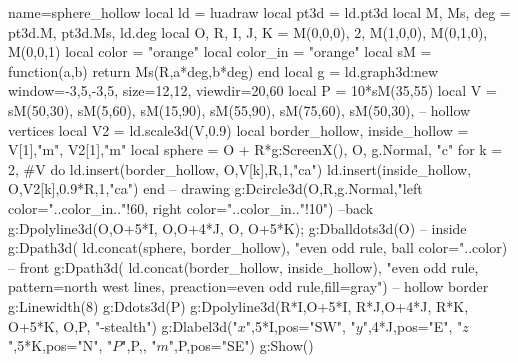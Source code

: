 \documentclass[border=5pt]{standalone}%
\begin{document}
\begin{luadraw}{name=sphere_hollow}
local ld = luadraw
local pt3d = ld.pt3d
local M, Ms, deg = pt3d.M, pt3d.Ms, ld.deg
local O, R, I, J, K = M(0,0,0), 2, M(1,0,0), M(0,1,0), M(0,0,1)
local color = "orange"
local color_in = "orange"
local sM = function(a,b)
    return Ms(R,a*deg,b*deg)
end
local g = ld.graph3d:new{ window={-3,5,-3,5}, size={12,12}, viewdir={20,60}}
local P = 10*sM(35,55)
local V = { sM(50,30), sM(5,60), sM(15,90), sM(55,90), sM(75,60), sM(50,30), } -- hollow vertices
local V2 = ld.scale3d(V,0.9)
local border_hollow, inside_hollow = {V[1],"m"}, {V2[1],"m"}
local sphere = {O + R*g:ScreenX(), O, g.Normal, "c"}
for k = 2, #V do 
    ld.insert(border_hollow, {O,V[k],R,1,"ca"}) 
    ld.insert(inside_hollow, {O,V2[k],0.9*R,1,"ca"}) 
end
-- drawing
g:Dcircle3d(O,R,g.Normal,"left color="..color_in.."!60, right color="..color_in.."!10") --back
g:Dpolyline3d({{O,O+5*I}, {O,O+4*J}, {O, O+5*K}}); g:Dballdots3d(O) -- inside
g:Dpath3d( ld.concat(sphere, border_hollow), "even odd rule, ball color="..color) -- front
g:Dpath3d( ld.concat(border_hollow, inside_hollow), 
    "even odd rule, pattern=north west lines, preaction={even odd rule,fill=gray}") -- hollow border
g:Linewidth(8)
g:Ddots3d(P)
g:Dpolyline3d({{R*I,O+5*I}, {R*J,O+4*J}, {R*K, O+5*K}, {O,P}}, "-stealth")
g:Dlabel3d("$x$",5*I,{pos="SW"}, "$y$",4*J,{pos="E"}, "$z$",5*K,{pos="N"}, 
"$P$",P,{}, "$m$",P,{pos="SE"})
g:Show()
\end{luadraw}
\end{document}
